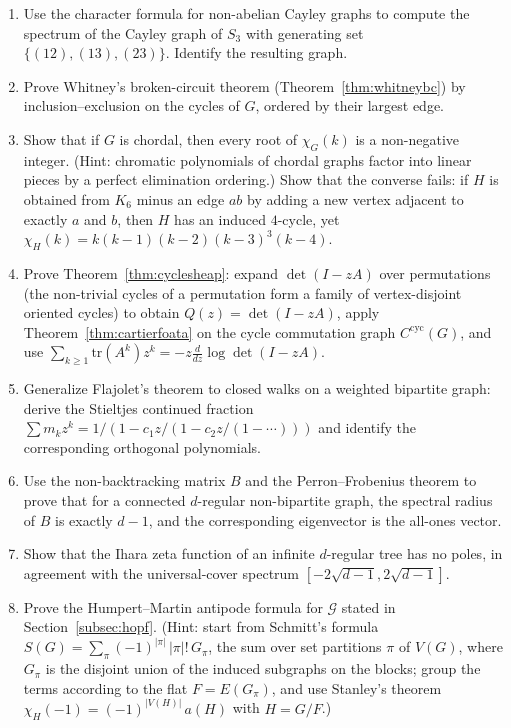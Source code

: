\begin{enumerate}[resume]
\item Use the character formula for non-abelian Cayley graphs to compute
the spectrum of the Cayley graph of $S_3$ with generating set
$\{(12), (13), (23)\}$. Identify the resulting graph.

\item Prove Whitney's broken-circuit theorem (Theorem~\ref{thm:whitneybc})
by inclusion--exclusion on the cycles of $G$, ordered by their largest
edge.

\item Show that if $G$ is chordal, then every root of $\chi_G(k)$ is a
non-negative integer. (Hint: chromatic polynomials of chordal graphs
factor into linear pieces by a perfect elimination ordering.) Show that
the converse fails: if $H$ is obtained from $K_6$ minus an edge $ab$ by
adding a new vertex adjacent to exactly $a$ and $b$, then $H$ has an
induced $4$-cycle, yet $\chi_H(k) = k(k-1)(k-2)(k-3)^3(k-4)$.

\item Prove Theorem~\ref{thm:cyclesheap}: expand $\det(I - zA)$ over
permutations (the non-trivial cycles of a permutation form a family of
vertex-disjoint oriented cycles) to obtain $Q(z) = \det(I - zA)$, apply
Theorem~\ref{thm:cartierfoata} on the cycle commutation
graph $C^{\mathrm{cyc}}(G)$, and use
$\sum_{k \ge 1} \mathrm{tr}(A^k) z^k = -z \frac{d}{dz} \log \det(I - zA)$.

\item Generalize Flajolet's theorem to closed walks on a weighted bipartite
graph: derive the Stieltjes continued fraction
$\sum m_k z^k = 1/(1 - c_1 z/(1 - c_2 z/(1 - \cdots)))$ and identify
the corresponding orthogonal polynomials.

\item Use the non-backtracking matrix $B$ and the Perron--Frobenius theorem
to prove that for a connected $d$-regular non-bipartite graph, the
spectral radius of $B$ is exactly $d - 1$, and the corresponding
eigenvector is the all-ones vector.

\item Show that the Ihara zeta function of an infinite $d$-regular tree
has no poles, in agreement with the universal-cover spectrum
$[-2\sqrt{d - 1}, 2\sqrt{d - 1}]$.

\item Prove the Humpert--Martin antipode formula for $\mathcal G$ stated in
Section~\ref{subsec:hopf}. (Hint: start from Schmitt's formula
$S(G) = \sum_{\pi} (-1)^{|\pi|}\, |\pi|!\, G_\pi$, the sum over set
partitions $\pi$ of $V(G)$, where $G_\pi$ is the disjoint union of the
induced subgraphs on the blocks; group the terms according to the flat
$F = E(G_\pi)$, and use Stanley's theorem
$\chi_H(-1) = (-1)^{|V(H)|}\, a(H)$ with $H = G/F$.)


\end{enumerate}
